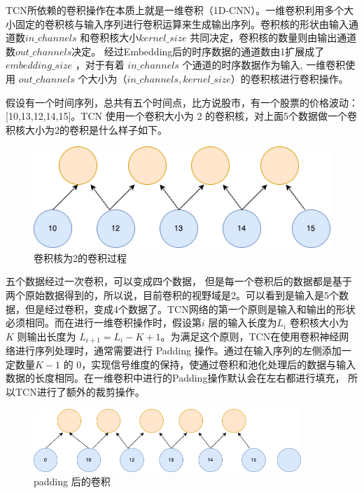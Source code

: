 TCN所依赖的卷积操作在本质上就是一维卷积（1D-CNN）。一维卷积利用多个大小固定的卷积核与输入序列进行卷积运算来生成输出序列。卷积核的形状由输入通道数$in\_channels$ 和卷积核大小$kernel\_size$ 共同决定，卷积核的数量则由输出通道数$out\_channels$决定。
经过Embedding后的时序数据的通道数由1扩展成了$embedding\_size$ ，对于有着 $in\_channels$ 个通道的时序数据作为输入, 一维卷积使用 $out\_channels$ 个大小为（$in\_channels, kernel\_size$）的卷积核进行卷积操作。

假设有一个时间序列，总共有五个时间点，比方说股市，有一个股票的价格波动：[10,13,12,14,15]。TCN 使用一个卷积大小为 2 的卷积核，对上面5个数据做一个卷积核大小为2的卷积是什么样子如下。

\begin{figure}[htbp]
  \centering
  \includegraphics[width=.9\textwidth]{figures/convolution_1.drawio.png}
  \caption{卷积核为2的卷积过程}
\end{figure}

五个数据经过一次卷积，可以变成四个数据，
但是每一个卷积后的数据都是基于两个原始数据得到的，所以说，目前卷积的视野域是2。可以看到是输入是5个数据，但是经过卷积，变成4个数据了。TCN网络的第一个原则是输入和输出的形状必须相同。而在进行一维卷积操作时，假设第$i$ 层的输入长度为$L_i$ 卷积核大小为 $K$ 则输出长度为 $L_{i+1} = L_{i} - K + 1$。为满足这个原则，TCN在使用卷积神经网络进行序列处理时，通常需要进行 Padding 操作。通过在输入序列的左侧添加一定数量$K-1$ 的 0，实现信号维度的保持，使通过卷积和池化处理后的数据与输入数据的长度相同。在一维卷积中进行的Padding操作默认会在左右都进行填充，
所以TCN进行了额外的裁剪操作。

\begin{figure}[htbp]
  \centering
  \includegraphics[width=0.9\textwidth]{figures/convolution_2.drawio.png}
  \caption{padding 后的卷积}
\end{figure}

